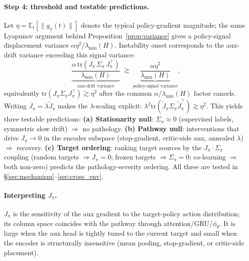\documentclass{article}
\theoremstyle{plain}
\theoremstyle{definition}
\theoremstyle{remark}
\begin{document}
\paragraph{Step 4: threshold and testable predictions.}
Let $\eta = \mathbb{E}_t[\|g_\pi(t)\|]$ denote the typical
policy-gradient magnitude; the same Lyapunov argument behind
Proposition~\ref{prop:variance} gives a policy-signal displacement
variance $\alpha \eta^2 / \lambda_{\min}(H)$. Instability onset
corresponds to the aux-drift variance exceeding this signal variance:
\begin{equation}
    \underbrace{\frac{\alpha \,\mathrm{tr}(J_\pi \,\Sigma_\pi\, J_\pi^\top)}{\lambda_{\min}(H)}}_{\text{aux-drift variance}}
    \;\gtrsim\;
    \underbrace{\frac{\alpha \eta^2}{\lambda_{\min}(H)}}_{\text{policy-signal variance}},
    \label{eq:threshold}
\end{equation}
equivalently $\mathrm{tr}(J_\pi \Sigma_\pi J_\pi^\top) \gtrsim
\eta^2$ after the common $\alpha/\lambda_{\min}(H)$ factor
cancels. Writing $J_\pi = \lambda \tilde J_\pi$ makes the
$\lambda$-scaling explicit: $\lambda^2 \mathrm{tr}(\tilde J_\pi
\Sigma_\pi \tilde J_\pi^\top) \gtrsim \eta^2$. This yields three
testable predictions:
\textbf{(a) Stationarity null}: $\Sigma_\pi \approx 0$ (supervised
labels, symmetric slow drift) $\Rightarrow$ no pathology.
\textbf{(b) Pathway null}: interventions that drive
$J_\pi \to 0$ in the encoder subspace (stop-gradient, critic-side
aux, annealed $\lambda$) $\Rightarrow$ recovery.
\textbf{(c) Target ordering}: ranking target sources by the
$J_\pi\!\cdot\Sigma_\pi$ coupling (random targets $\Rightarrow J_\pi
{=} 0$; frozen targets $\Rightarrow \Sigma_\pi {=} 0$; co-learning
$\Rightarrow$ both non-zero) predicts the pathology-severity ordering.
All three are tested in \S\ref{sec:mechanism}--\ref{sec:cross_env}.

\paragraph{Interpreting $J_\pi$.}
$J_\pi$ is the sensitivity of the aux gradient to the target-policy
action distribution; its column space coincides with the pathway
through attention/GRU/$\phi_\theta$. It is large when the aux head
is tightly tuned to the current target and small when the encoder
is structurally insensitive (mean pooling, stop-gradient, or
critic-side placement).
\end{document}
